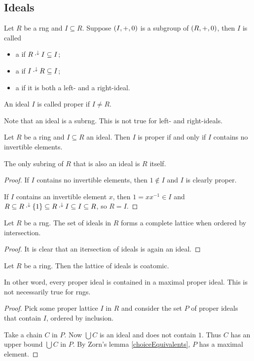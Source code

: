 \subsection{Ideals}
\begin{definition}
Let $R$ be a rng and $I\subseteq R$. Suppose $\left( I,+,0 \right)$ is a subgroup of $\left( R,+,0 \right)$, then $I$ is called
\begin{itemize}
\item a  if $R\cdot^\downarrow I \subseteq I$;
\item a  if $I\cdot^\downarrow R \subseteq I$;
\item a  if it is both a left- and a right-ideal.
\end{itemize}
An ideal $I$ is called proper if $I\neq R$.
\end{definition}
Note that an ideal is a subrng. This is not true for left- and right-ideals.

\begin{lemma} \label{properIdealNoUnit}
Let $R$ be a ring and $I\subseteq R$ an ideal. Then $I$ is proper \textup{if and only if} $I$ contains no invertible elements.
\end{lemma}
The only subring of $R$ that is also an ideal is $R$ itself.
\begin{proof}
If $I$ contains no invertible elements, then $1\notin I$ and $I$ is clearly proper.

If $I$ contains an invertible element $x$, then $1 = xx^{-1}\in I$ and $R \subseteq R\cdot^\downarrow\{1\} \subseteq R\cdot^\downarrow I \subseteq I \subseteq R$, so $R = I$.
\end{proof}

\begin{lemma}
Let $R$ be a rng. The set of ideals in $R$ forms a complete lattice when ordered by intersection.
\end{lemma}
\begin{proof}
It is clear that an itersection of ideals is again an ideal.
\end{proof}

\begin{proposition}  \label{idealLatticeCoatomic}
Let $R$ be a ring. Then the lattice of ideals is coatomic.
\end{proposition}
In other word, every proper ideal is contained in a maximal proper ideal. This is not necessarily true for rngs.
\begin{proof}
Pick some proper lattice $I$ in $R$ and consider the set $P$ of proper ideals that contain $I$, ordered by inclusion.

Take a chain $C$ in $P$. Now $\bigcup C$ is an ideal and does not contain $1$. Thus $C$ has an upper bound $\bigcup C$ in $P$. By Zorn's lemma \ref{choiceEquivalents}, $P$ has a maximal element.
\end{proof}


